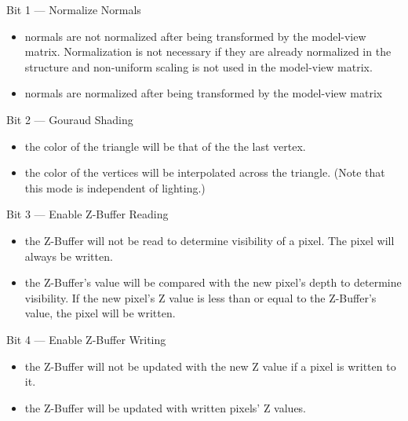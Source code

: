 \documentclass{book}
\begin{document}
\begin{indented}{\sc Bit 1 --- Normalize Normals}
  \begin{itemize}
     \item[If 0] normals are not normalized after being transformed by the
       model-view matrix.  Normalization is not necessary if they are
       already normalized in the structure and non-uniform scaling is
       not used in the model-view matrix.
     \item[If 1] normals are normalized after being transformed by
       the model-view matrix
  \end{itemize}
\end{indented}

\begin{indented}{\sc Bit 2 --- Gouraud Shading}
  \begin{itemize}
     \item[If 0] the color of the triangle will be that of the the last vertex.
     \item[If 1] the color of the vertices will be interpolated
       across the triangle.  (Note that this mode is independent of
       lighting.)
  \end{itemize}
\end{indented}

\begin{indented}{\sc Bit 3 --- Enable Z-Buffer Reading}
  \begin{itemize}
     \item[If 0] the Z-Buffer will not be read to determine
       visibility of a pixel.  The pixel will always be written.
     \item[If 1] the Z-Buffer's value will be compared with the new
       pixel's depth to determine visibility.  If the new pixel's Z
       value is less than or equal to the Z-Buffer's value, the pixel
       will be written.
  \end{itemize}
\end{indented}

\begin{indented}{\sc Bit 4 --- Enable Z-Buffer Writing}
  \begin{itemize}
     \item[If 0] the Z-Buffer will not be updated with the new Z
       value if a pixel is written to it.
     \item[If 1] the Z-Buffer will be updated with written pixels' Z values.
  \end{itemize}
\end{indented}
\end{document}
